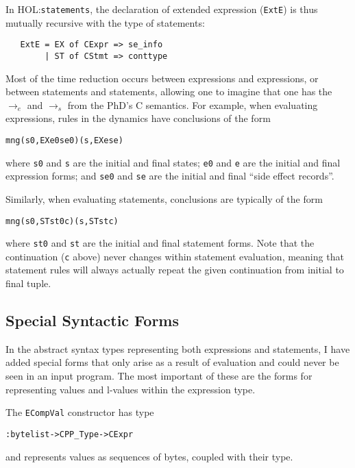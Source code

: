 \documentclass[11pt]{article}
\newcommand{\HOLfile}[1]{HOL:\texttt{#1}}
\begin{document}
In \HOLfile{statements}, the declaration of extended expression
(\texttt{ExtE}) is thus mutually recursive with the type of
statements:
\begin{verbatim}
   ExtE = EX of CExpr => se_info
        | ST of CStmt => conttype
\end{verbatim}

Most of the time reduction occurs between expressions and expressions,
or between statements and statements, allowing one to imagine that one
has the $\rightarrow_e$ and $\rightarrow_s$ from the PhD's C
semantics.  For example, when evaluating expressions, rules in the
dynamics have conclusions of the form
\begin{alltt}
   mng (s0, EX e0 se0) (s, EX e se)
\end{alltt}
where \texttt{s0} and \texttt{s} are the initial and final states;
\texttt{e0} and \texttt{e} are the initial and final expression forms;
and \texttt{se0} and \texttt{se} are the initial and final ``side
effect records''.

Similarly, when evaluating statements, conclusions are typically of
the form
\begin{alltt}
   mng (s0, ST st0 c) (s, ST st c)
\end{alltt}
where \texttt{st0} and \texttt{st} are the initial and final statement
forms.  Note that the continuation (\texttt{c} above) never changes
within statement evaluation, meaning that statement rules will always
actually repeat the given continuation from initial to final tuple.

\subsection{Special Syntactic Forms}
\label{sec:spec-synt-forms}

In the abstract syntax types representing both expressions and
statements, I have added special forms that only arise as a result of
evaluation and could never be seen in an input program.  The most
important of these are the forms for representing values and l-values
within the expression type.

The \texttt{ECompVal} constructor has type
\begin{alltt}
   : byte list -> CPP_Type -> CExpr
\end{alltt}
and represents values as sequences of bytes, coupled with their type.
\end{document}
